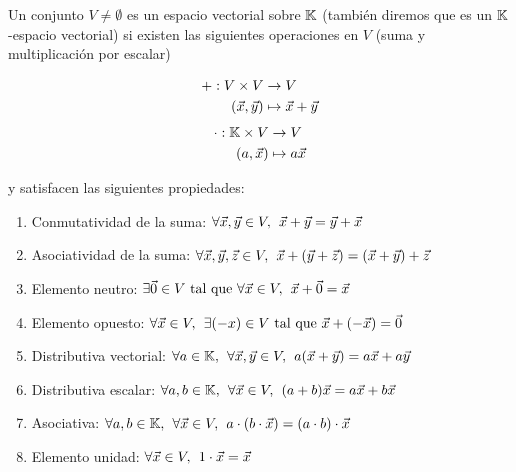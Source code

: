 \documentclass[../ecuaciones_diferenciales.tex]{subfiles}
\begin{document}
\begin{definition}
    \label{vector_space_definition}
    Un conjunto $V \neq \emptyset$ es un espacio vectorial sobre $\mathbb{K}$ (también diremos que es un $\mathbb{K}$-espacio vectorial) si existen las siguientes operaciones en $V$ (suma y multiplicación por escalar) 
    
    \begin{multicols}{2}
        \noindent
        \begin{align*} +: V \times V &\to V \\
                (\vec{x}, \vec{y}) &\mapsto \vec{x} + \vec{y}
        \end{align*}
        \begin{align*}
            \cdot: \mathbb{K} \times V &\to V \\
                (a, \vec{x}) &\mapsto a \vec{x}
        \end{align*}
    \end{multicols}

    y satisfacen las siguientes propiedades:

    \begin{enumerate}
        \item Conmutatividad de la suma: $\forall \vec{x}, \vec{y} \in V, \hspace{1.5mm} \vec{x} + \vec{y} = \vec{y} + \vec{x}$
        \item Asociatividad de la suma: $\forall \vec{x}, \vec{y}, \vec{z} \in V, \hspace{1.5mm} \vec{x} + (\vec{y} + \vec{z}) = (\vec{x} + \vec{y}) + \vec{z}$
        \item \label{espacio_vectorial_neutro} Elemento neutro: $\exists \vec{0} \in V \mathrm{\,\, tal \,\, que \,\,} \forall \vec{x} \in V, \hspace{1.5mm} \vec{x} + \vec{0} = \vec{x}$
        \item \label{espacio_vectorial_opuesto} Elemento opuesto: $\forall \vec{x} \in V, \hspace{1.5mm} \exists {({-x})} \in V \mathrm{\,\, tal \,\, que \,\,}  \vec{x} + (-\vec{x}) = \vec{0}$
        \item Distributiva vectorial: $\forall a \in \mathbb{K}, \hspace{1.5mm} \forall \vec{x}, \vec{y} \in V, \hspace{1.5mm} a(\vec{x} + \vec{y}) = a\vec{x} + a \vec{y}$
        \item Distributiva escalar: $\forall a, b\in \mathbb{K}, \hspace{1.5mm} \forall \vec{x} \in V, \hspace{1.5mm} (a+b)\vec{x} = a\vec{x} + b\vec{x}$ 
        \item Asociativa: $\forall a, b \in \mathbb{K}, \hspace{1.5mm} \forall \vec{x} \in V, \hspace{1.5mm} a \cdot (b \cdot \vec{x}) = (a\cdot b) \cdot \vec{x} $
        \item \label{espacio_vectorial_unidad} Elemento unidad: $\forall \vec{x} \in V, \hspace{1.5mm} 1 \cdot \vec{x} = \vec{x}$ 
    \end{enumerate}

\end{definition}
\end{document}
